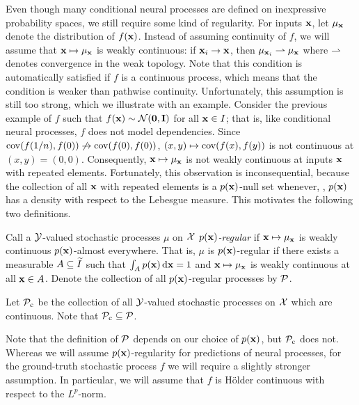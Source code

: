 \documentclass[12pt, twoside]{report}
\begin{document}
Even though many conditional neural processes are defined on inexpressive probability spaces, we still require some kind of regularity.
For inputs $\mathbf{x}$, let $\mu_{\mathbf{x}}$ denote the distribution of $f(\mathbf{x})$.
Instead of assuming continuity of $f$, we will assume that $\mathbf{x} \mapsto \mu_{\mathbf{x}}$ is weakly continuous:
if $\mathbf{x}_i \to \mathbf{x}$, then $\mu_{\mathbf{x}_i} \rightharpoonup \mu_{\mathbf{x}}$ where $\rightharpoonup$ denotes convergence in the weak topology.
Note that this condition is automatically satisfied if $f$ is a continuous process, which means that the condition is weaker than pathwise continuity.
Unfortunately, this assumption is still too strong, which we illustrate with an example.
Consider the previous example of $f$ such that $f(\mathbf{x}) \sim \mathcal{N}(\mathbf{0},\mathbf{I})$ for all $\mathbf{x} \in I$;
that is, like conditional neural processes, $f$ does not model dependencies.
Since $\operatorname{cov}(f(1/n), f(0)) \not\to \operatorname{cov}(f(0), f(0))$, $(x, y) \mapsto \operatorname{cov}(f(x), f(y))$ is not continuous at $(x, y) = (0, 0)$.
Consequently, $\mathbf{x} \mapsto \mu_{\mathbf{x}}$ is not weakly continuous at inputs $\mathbf{x}$ with repeated elements.
Fortunately, this observation is inconsequential,
because the collection of all $\mathbf{x}$ with repeated elements is a $p(\mathbf{x})$-null set whenever, \eg, $p(\mathbf{x})$ has a density with respect to the Lebesgue measure.
This motivates the following two definitions.

\begin{definition}
    Call a $\mathcal{Y}$-valued stochastic processes $\mu$ on $\mathcal{X}$ \emph{$p(\mathbf{x})$-regular} if $\mathbf{x} \mapsto \mu_{\mathbf{x}}$ is  weakly continuous $p(\mathbf{x})$-almost everywhere. 
    That is, $\mu$ is $p(\mathbf{x})$-regular if there exists a measurable $A \subseteq \widetilde{I}$ such that $\int_A p(\mathbf{x}) \, \mathrm{d} \mathbf{x} = 1$ and $\mathbf{x} \mapsto \mu_{\mathbf{x}}$ is weakly continuous at all $\mathbf{x} \in A$.
    Denote the collection of all $p(\mathbf{x})$-regular processes by $\mathcal{P}$.
\end{definition}

\begin{definition}
    Let $\Pc\ss{c}$ be the collection of all $\mathcal{Y}$-valued stochastic processes on $\mathcal{X}$ which are continuous.
    Note that $\Pc\ss{c} \sub \Pc$.
\end{definition}

Note that the definition of $\mathcal{P}$ depends on our choice of $p(\mathbf{x})$, but $\Pc\ss{c}$ does not.
%
Whereas we will assume $p(\mathbf{x})$-regularity for predictions of neural processes, for the ground-truth stochastic process $f$ we will require a slightly stronger assumption.
In particular, we will assume that $f$ is H\"older continuous with respect to the $L^p$-norm.
\end{document}
